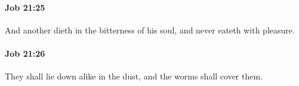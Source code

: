 		\paragraph{Job 21:25} %
			\label{JOB-21-25}

			And another dieth in the bitterness of his soul, and never eateth with pleasure.


		\paragraph{Job 21:26} %
			\label{JOB-21-26}

			They shall lie down alike in the dust, and the worms shall cover them.


